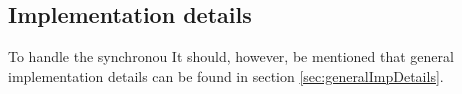 \documentclass[Main]{subfiles}
\begin{document}
\subsection{Implementation details}
To handle the synchronou
It should, however, be mentioned that general implementation details can be found in section \ref{sec:generalImpDetails}.
\end{document}
